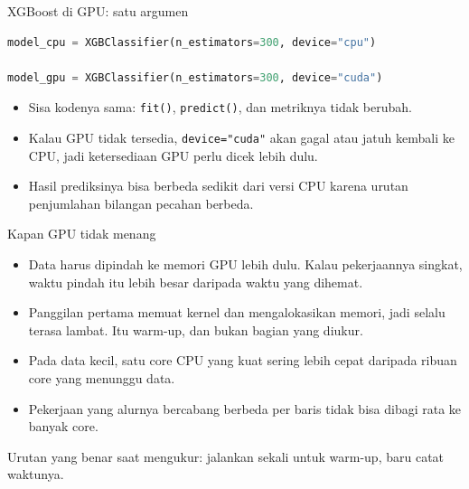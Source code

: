 \documentclass[aspectratio=169,t]{beamer}
\begin{document}
\begin{frame}[fragile]{XGBoost di GPU: satu argumen}
  \vspace{0.5em}
\begin{lstlisting}[language=Python, numbers=none, basicstyle=\ttfamily\normalsize\color{nvwhite}]
model_cpu = XGBClassifier(n_estimators=300, device="cpu")

model_gpu = XGBClassifier(n_estimators=300, device="cuda")
\end{lstlisting}
  \vspace{0.7em}
  \begin{itemize}\setlength\itemsep{0.4em}
    \item Sisa kodenya sama: \texttt{fit()}, \texttt{predict()}, dan metriknya tidak berubah.
    \item Kalau GPU tidak tersedia, \texttt{device="cuda"} akan gagal atau jatuh kembali ke CPU,
          jadi ketersediaan GPU perlu dicek lebih dulu.
    \item Hasil prediksinya bisa berbeda sedikit dari versi CPU karena urutan penjumlahan
          bilangan pecahan berbeda.
  \end{itemize}
\end{frame}

\begin{frame}{Kapan GPU tidak menang}
  \vspace{0.5em}
  \begin{itemize}\setlength\itemsep{0.5em}
    \item Data harus dipindah ke memori GPU lebih dulu. Kalau pekerjaannya singkat, waktu
          pindah itu lebih besar daripada waktu yang dihemat.
    \item Panggilan pertama memuat kernel dan mengalokasikan memori, jadi selalu terasa lambat.
          Itu warm-up, dan bukan bagian yang diukur.
    \item Pada data kecil, satu core CPU yang kuat sering lebih cepat daripada ribuan core yang
          menunggu data.
    \item Pekerjaan yang alurnya bercabang berbeda per baris tidak bisa dibagi rata ke banyak
          core.
  \end{itemize}
  \vspace{0.7em}
  {\footnotesize\color{nvgray}Urutan yang benar saat mengukur: jalankan sekali untuk warm-up,
  baru catat waktunya.}
\end{frame}
\end{document}
